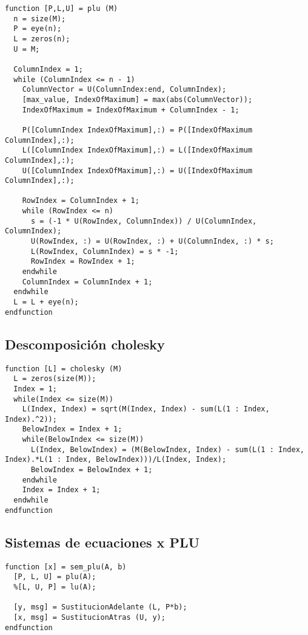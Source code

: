 \documentclass[10pt]{article}
\begin{document}
\begin{lstlisting}
function [P,L,U] = plu (M)
  n = size(M);
  P = eye(n);
  L = zeros(n);
  U = M;

  ColumnIndex = 1;
  while (ColumnIndex <= n - 1)
    ColumnVector = U(ColumnIndex:end, ColumnIndex);
    [max_value, IndexOfMaximum] = max(abs(ColumnVector));
    IndexOfMaximum = IndexOfMaximum + ColumnIndex - 1;
    
    P([ColumnIndex IndexOfMaximum],:) = P([IndexOfMaximum ColumnIndex],:);
    L([ColumnIndex IndexOfMaximum],:) = L([IndexOfMaximum ColumnIndex],:);
    U([ColumnIndex IndexOfMaximum],:) = U([IndexOfMaximum ColumnIndex],:);
    
    RowIndex = ColumnIndex + 1;
    while (RowIndex <= n)
      s = (-1 * U(RowIndex, ColumnIndex)) / U(ColumnIndex, ColumnIndex);
      U(RowIndex, :) = U(RowIndex, :) + U(ColumnIndex, :) * s;
      L(RowIndex, ColumnIndex) = s * -1;
      RowIndex = RowIndex + 1;
    endwhile
    ColumnIndex = ColumnIndex + 1;
  endwhile
  L = L + eye(n);
endfunction
\end{lstlisting}


{}
\subsection*{Descomposición cholesky}

\begin{lstlisting}
function [L] = cholesky (M)
  L = zeros(size(M));
  Index = 1;
  while(Index <= size(M))
    L(Index, Index) = sqrt(M(Index, Index) - sum(L(1 : Index, Index).^2));
    BelowIndex = Index + 1;
    while(BelowIndex <= size(M))
      L(Index, BelowIndex) = (M(BelowIndex, Index) - sum(L(1 : Index, Index).*L(1 : Index, BelowIndex)))/L(Index, Index);
      BelowIndex = BelowIndex + 1;
    endwhile
    Index = Index + 1;
  endwhile
endfunction
\end{lstlisting}


{}
\subsection*{Sistemas de ecuaciones x PLU}

\begin{lstlisting}
function [x] = sem_plu(A, b)
  [P, L, U] = plu(A);
  %[L, U, P] = lu(A);
  
  [y, msg] = SustitucionAdelante (L, P*b);
  [x, msg] = SustitucionAtras (U, y);
endfunction
\end{lstlisting}
\end{document}

